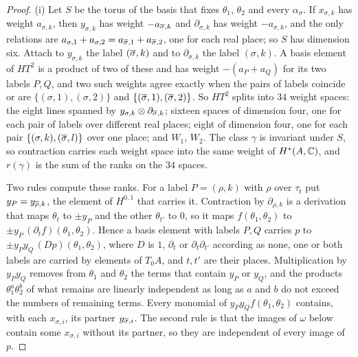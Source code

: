 \begin{proof}
(i) Let $S$ be the torus of the basis that fixes $\theta_{1}$, $\theta_{2}$
and every $\alpha_{\sigma}$. If $x_{\sigma,k}$ has weight $a_{\sigma,k}$, then
$y_{\sigma,k}$ has weight $-a_{\overline{\sigma},k}$ and $\partial_{\sigma,k}$ has
weight $-a_{\sigma,k}$, and the only relations are
$a_{\sigma,1}+a_{\sigma,2}=a_{\overline{\sigma},1}+a_{\overline{\sigma},2}$, one for each
real place; so $S$ has dimension six. Attach to $y_{\sigma,k}$ the label
$(\overline{\sigma},k)$ and to $\partial_{\sigma,k}$ the label $(\sigma,k)$. A basis
element of $HT^{2}$ is a product of two of these and has weight
$-(a_{P}+a_{Q})$ for its two labels $P,Q$, and two such weights agree exactly
when the pairs of labels coincide or are $\{(\sigma,1),(\sigma,2)\}$ and
$\{(\overline{\sigma},1),(\overline{\sigma},2)\}$. So $HT^{2}$ splits into $34$ weight
spaces: the eight lines spanned by $y_{\sigma,k}\otimes
\partial_{\overline{\sigma},k}$; sixteen spaces of dimension four, one for each
pair of labels over different real places; eight of dimension four, one for
each pair $\{(\sigma,k),(\overline{\sigma},l)\}$ over one place; and $W_{1}$,
$W_{2}$. The class $\gamma$ is invariant under $S$, so contraction carries
each weight space into the same weight of $H^{*}(A,\mathbb{C})$, and $r(\gamma)$ is
the sum of the ranks on the $34$ spaces.

Two rules compute these ranks. For a label $P=(\rho,k)$ with $\rho$ over
$\tau_{t}$ put $y_{P}=y_{\overline{\rho},k}$, the element of $H^{0,1}$ that carries
it. Contraction by $\partial_{\rho,k}$ is a derivation that maps $\theta_{t}$ to
$\pm y_{P}$ and the other $\theta_{t'}$ to $0$, so it maps $f(\theta_{1},
\theta_{2})$ to $\pm y_{P}\,(\partial_{t}f)(\theta_{1},\theta_{2})$. Hence a basis
element with labels $P,Q$ carries $p$ to $\pm y_{P}y_{Q}\,(Dp)(\theta_{1},
\theta_{2})$, where $D$ is $1$, $\partial_{t}$ or $\partial_{t}\partial_{t'}$
according as none, one or both labels are carried by elements of $T_{0}A$, and
$t,t'$ are their places. Multiplication by $y_{P}y_{Q}$ removes from
$\theta_{1}$ and $\theta_{2}$ the terms that contain $y_{P}$ or $y_{Q}$, and
the products $\theta_{1}^{a}\theta_{2}^{b}$ of what remains are linearly
independent as long as $a$ and $b$ do not exceed the numbers of remaining
terms. Every monomial of $y_{P}y_{Q}f(\theta_{1},\theta_{2})$ contains, with
each $x_{\sigma,i}$, its partner $y_{\overline{\sigma},i}$. The second rule is that
the images of $\omega$ below contain some $x_{\sigma,i}$ without its partner,
so they are independent of every image of $p$.


\end{proof}
